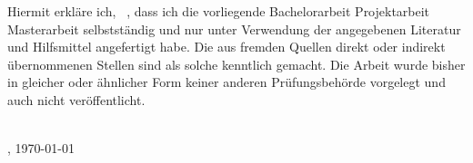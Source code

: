 \documentclass[
              11pt,								  %
              twoside,                              %
              numbers=noenddot,                     %
              listof=totoc,                         %
              bibliography=totoc,                   %
              captions=tableheading, %
              openright,							%
              ]{scrreprt}                           %
\begin{document}
Hiermit erkläre ich, \VornameDesStudenten \ \NachnameDesStudenten, dass ich die vorliegende 
			{Bachelorarbeit}{}
			{Projektarbeit}{}
			{Masterarbeit}{} selbstständig und nur unter Verwendung der angegebenen Literatur und Hilfsmittel angefertigt habe. Die aus fremden Quellen direkt oder indirekt übernommenen Stellen sind als solche kenntlich gemacht. 
Die Arbeit wurde bisher in gleicher oder ähnlicher Form keiner anderen Prüfungsbehörde vorgelegt und auch nicht veröffentlicht. 
\\
\\
\par

\Ort, \today  \hfill \hrulefill

\hfill \VornameDesStudenten \ \NachnameDesStudenten \hfill
\end{document}
